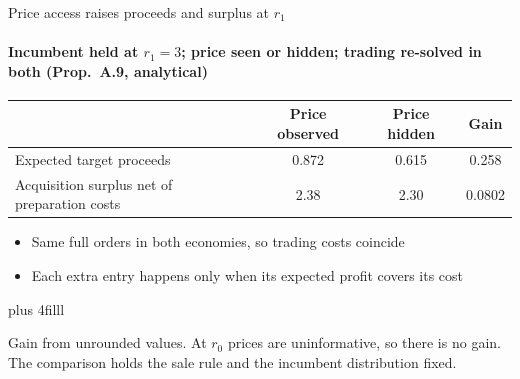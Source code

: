 \documentclass[10pt,aspectratio=169]{beamer}
\newcommand{\GrayLine}[1]{\par{\color{cGrayText}\footnotesize #1\par}}
\newcommand{\NavGap}{\par\vspace{0.45cm}}%
\begin{document}
\begin{frame}[t,label=F14]{Price access raises proceeds and surplus at $r_1$}
\framesubtitle{Incumbent held at $r_1=3$; %
price seen or hidden; trading re-solved in both (Prop.~A.9, analytical)}
\hypertarget{main:reserve}{}
\vspace{6pt}
\begin{center}
\renewcommand{\arraystretch}{1.25}
\begin{tabular*}{0.92\textwidth}{@{\extracolsep{\fill}}lccc@{}}
\toprule
 & Price observed & Price hidden & Gain\\
\midrule
Expected target proceeds & 0.872 %
 & 0.615 %
 & 0.258\\ %
Acquisition surplus net of preparation costs & 2.38 %
 & 2.30 %
 & 0.0802\\ %
\bottomrule
\end{tabular*}
\end{center}
\begin{itemize}\setlength{\itemsep}{4pt}
\item Same full orders in both economies, so trading costs coincide
\item Each extra entry happens only when its expected profit covers its cost
\end{itemize}
\vskip 0pt plus 4filll%
\GrayLine{Gain from unrounded values. At $r_0$ prices are uninformative, so there is no gain. The comparison holds the sale rule and the incumbent distribution fixed.}
\NavGap
{}
\end{frame}
\end{document}
